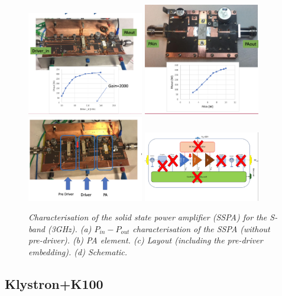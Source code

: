 \documentclass[12pt]{amsart}
\begin{document}
\begin{figure}[htbp] %
   \centering
   \includegraphics[width=2in]{im/sspa4.png} 
   \includegraphics[width=2in]{im/sspa3.png} \\
   \includegraphics[width=2in]{im/sspa1.png} 
   \includegraphics[width=2in]{im/sspa2.png} 
   \caption{\em Characterisation of the solid state power amplifier (SSPA) for the S-band (3GHz).
   (a) $P_{in} - P_{out}$ characterisation of the SSPA (without pre-driver).
   (b) PA element.
   (c) Layout (including the pre-driver embedding).
   (d) Schematic.}
   \label{fig:sspa}
\end{figure}

\subsection{Klystron+K100}
\end{document}
